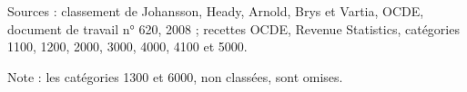 Sources : classement de Johansson, Heady, Arnold, Brys et Vartia, OCDE, document de travail n° 620, 2008 ; recettes OCDE, Revenue Statistics, catégories 1100, 1200, 2000, 3000, 4000, 4100 et 5000.\par Note : les catégories 1300 et 6000, non classées, sont omises.
